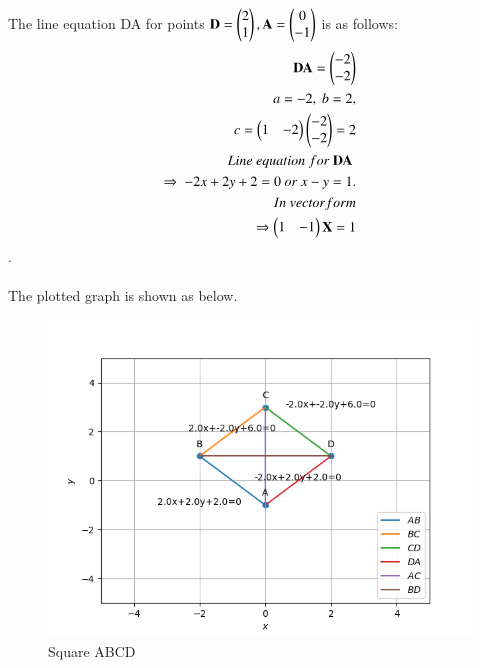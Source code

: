 \documentclass[journal,12pt,twocolumn]{IEEEtran}
\begin{document}
\\
\\
The line equation DA for points $\mathbf{D} = \begin{pmatrix}2\\1\end{pmatrix}, \mathbf{A} = \begin{pmatrix}0\\-1\end{pmatrix}$ is as follows:\\
\begin{align}
\begin{split}
\mathbf{DA} = \begin{pmatrix}-2\\-2\end{pmatrix}\\
a=-2,\ b=2,\\
c=\begin{pmatrix}1 & -2\end{pmatrix} \begin{pmatrix}-2\\-2\end{pmatrix}=2\\
Line\ equation\ for\ \mathbf{DA}\ \\ \Rightarrow\ -2x+2y+2=0 \ or \ x-y=1. \\
In\ vector form\\
\Rightarrow \begin{pmatrix}1&-1\end{pmatrix}\mathbf{X}=1
\end{split}
\end{align}.
\\
\\
The plotted graph is shown as below.
\begin{figure}[!ht]
    \centering
    \includegraphics[width=\columnwidth]{assignment2.png}
    \caption{Square ABCD}
    \label{fig:Square ABCD}
\end{figure}
\end{document}
